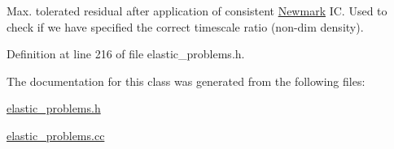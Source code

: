 Max. tolerated residual after application of consistent \hyperlink{classoomph_1_1Newmark}{Newmark} IC. Used to check if we have specified the correct timescale ratio (non-\/dim density). 



Definition at line 216 of file elastic\+\_\+problems.\+h.



The documentation for this class was generated from the following files\+:\begin{DoxyCompactItemize}
\item 
\hyperlink{elastic__problems_8h}{elastic\+\_\+problems.\+h}\item 
\hyperlink{elastic__problems_8cc}{elastic\+\_\+problems.\+cc}\end{DoxyCompactItemize}
